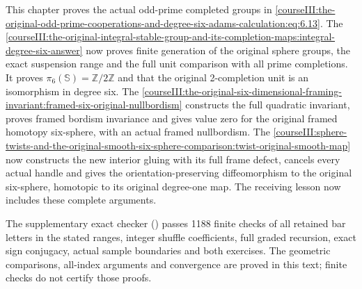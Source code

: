 This chapter proves the actual odd-prime completed groups in \eqref{courseIII:the-original-odd-prime-cooperations-and-degree-six-adams-calculation:eq:6.13}. The \cref{courseIII:the-original-integral-stable-group-and-its-completion-maps:integral-degree-six-answer} now proves finite generation of the original sphere groups, the exact suspension range and the full unit comparison with all prime completions. It proves \(\pi_6(\mathbb S)=\mathbb Z/2\mathbb Z\) and that the original 2-completion unit is an isomorphism in degree six. The \cref{courseIII:the-original-six-dimensional-framing-invariant:framed-six-original-nullbordism} constructs the full quadratic invariant, proves framed bordism invariance and gives value zero for the original framed homotopy six-sphere, with an actual framed nullbordism. The \cref{courseIII:sphere-twists-and-the-original-smooth-six-sphere-comparison:twist-original-smooth-map} now constructs the new interior gluing with its full frame defect, cancels every actual handle and gives the orientation-preserving diffeomorphism to the original six-sphere, homotopic to its original degree-one map. The receiving lesson now includes these complete arguments.

The supplementary exact checker () passes 1188 finite checks of all retained bar letters in the stated ranges, integer shuffle coefficients, full graded recursion, exact sign conjugacy, actual sample boundaries and both exercises. The geometric comparisons, all-index arguments and convergence are proved in this text; finite checks do not certify those proofs.
